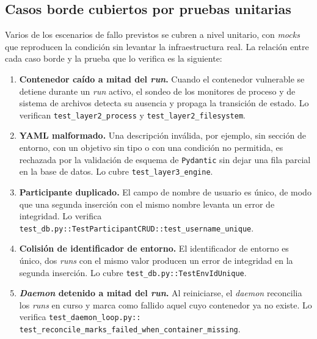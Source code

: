 \subsection{Casos borde cubiertos por pruebas unitarias}
\label{sec:casos-borde}

Varios de los escenarios de fallo previstos se cubren a nivel unitario, con
\textit{mocks} que reproducen la condición sin levantar la infraestructura real.
La relación entre cada caso borde y la prueba que lo verifica es la
siguiente:

\begin{enumerate}
  \item \textbf{Contenedor caído a mitad del \textit{run}.} Cuando el
        contenedor vulnerable se detiene durante un \textit{run} activo, el
        sondeo de los monitores de proceso y de sistema de archivos detecta su
        ausencia y propaga la transición de estado. Lo verifican
        \texttt{test\_layer2\_process} y \texttt{test\_layer2\_filesystem}.
  \item \textbf{YAML malformado.} Una descripción inválida, por ejemplo, sin
        sección de entorno, con un objetivo sin tipo o con una condición no
        permitida, es rechazada por la validación de esquema de
        \texttt{Pydantic} sin dejar una fila parcial en la base de datos. Lo
        cubre
        \texttt{test\_layer3\_engine}.
  \item \textbf{Participante duplicado.} El campo de nombre de usuario es único,
        de modo que una segunda inserción con el mismo nombre levanta un error
        de integridad. Lo verifica
        \texttt{test\_db.py::TestParticipantCRUD::test\_username\_unique}.
  \item \textbf{Colisión de identificador de entorno.} El identificador de
        entorno es único, dos \textit{runs} con el mismo valor producen un error
        de integridad en la segunda inserción. Lo cubre
        \texttt{test\_db.py::TestEnvIdUnique}.
  \item \begin{sloppypar}\textbf{\textit{Daemon} detenido a mitad del
        \textit{run}.} Al
        reiniciarse, el \textit{daemon} reconcilia los \textit{runs} en curso y
        marca como fallido aquel cuyo contenedor ya no existe. Lo verifica
        \texttt{test\_daemon\_loop.py::%
test\_reconcile\_marks\_failed\_when\_container\_missing}. \end{sloppypar}
\end{enumerate}

